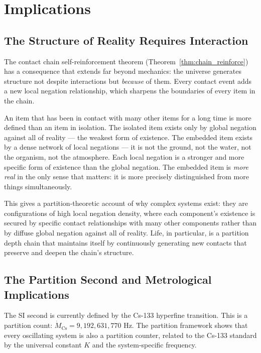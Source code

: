 
\section{Implications}
\label{sec:implications}

\subsection{The Structure of Reality Requires Interaction}
\label{subsec:structure}

The contact chain self-reinforcement theorem (Theorem~\ref{thm:chain_reinforce})
has a consequence that extends far beyond mechanics: the universe generates
structure not despite interactions but \emph{because} of them. Every contact
event adds a new local negation relationship, which sharpens the boundaries of
every item in the chain.

An item that has been in contact with many other items for a long time is more
defined than an item in isolation. The isolated item exists only by global
negation against all of reality --- the weakest form of existence. The embedded
item exists by a dense network of local negations --- it is not the ground, not
the water, not the organism, not the atmosphere. Each local negation is a
stronger and more specific form of existence than the global negation. The
embedded item is \emph{more real} in the only sense that matters: it is more
precisely distinguished from more things simultaneously.

This gives a partition-theoretic account of why complex systems exist: they are
configurations of high local negation density, where each component's existence
is secured by specific contact relationships with many other components rather
than by diffuse global negation against all of reality. Life, in particular, is
a partition depth chain that maintains itself by continuously generating new
contacts that preserve and deepen the chain's structure.

\subsection{The Partition Second and Metrological Implications}
\label{subsec:metrology}

The SI second is currently defined by the Cs-133 hyperfine transition. This is
a partition count: $\dot{M}_{\mathrm{Cs}} = 9{,}192{,}631{,}770$ Hz. The
partition framework shows that every oscillating system is also a partition
counter, related to the Cs-133 standard by the universal constant $K$ and the
system-specific frequency.

